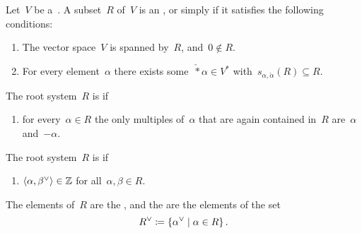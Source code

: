 \begin{definition}
  Let~$V$ be a~{\vectorspace{$\kf$}}.
  A subset~$R$ of~$V$ is an , or simply  if it satisfies the following conditions:
  \begin{enumerate}
    \item
      The vector space~$V$ is spanned by~$R$, and~$0 \notin R$.
    \item
      For every element~$\alpha$ there exists some~$\check*{\alpha} \in V^*$ with~$s_{\alpha, \check{\alpha}}(R) \subseteq R$.
  \end{enumerate}
  The root system~$R$ is  if
  \begin{enumerate}[resume]
    \item
      for every~$\alpha \in R$ the only multiples of~$\alpha$ that are again contained in~$R$ are~$\alpha$ and~$-\alpha$.
  \end{enumerate}
  The root system~$R$ is  if
  \begin{enumerate}[resume]
    \item
      $\pair{\alpha, \check{\beta}} \in \Integer$ for all~$\alpha, \beta \in R$.
  \end{enumerate}
  The elements of~$R$ are the , and the  are the elements of the set
  \[
    \check{R}
    \defined
    \{
      \check{\alpha}
    \suchthat
      \alpha \in R
    \} \,.
  \]
\end{definition}


